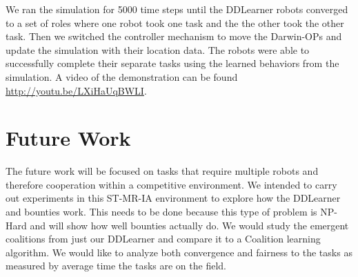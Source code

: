 \documentclass[twocolumn]{article}
\begin{document}
We ran the simulation for 5000 time steps until the DDLearner robots converged to a set of roles where one robot took one task and the the other took the other task.  Then we switched the controller mechanism to move the Darwin-OPs and update the simulation with their location data.  The robots were able to successfully complete their separate tasks using the learned behaviors from the simulation.  A video of the demonstration can be found \url{http://youtu.be/LXiHaUqBWLI}.

\section{Future Work}
The future work will be focused on tasks that require multiple robots and therefore cooperation within a competitive environment.  We intended to carry out experiments in this ST-MR-IA environment to explore how the DDLearner and bounties work. This needs to be done because this type of problem is NP-Hard and will show how well bounties actually do.  We would study the emergent coalitions from just our DDLearner and compare it to a Coalition learning algorithm.  We would like to analyze both convergence and fairness to the tasks as measured by average time the tasks are on the field.



\end{document}
